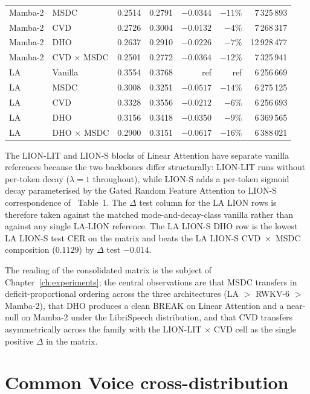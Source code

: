 {\begin{longtable}{@{}p{2.6cm} p{2.4cm} r r r r r@{}}
Mamba-2  & MSDC              & 0.2514 & 0.2791 & $-0.0344$ & $-11\%$ & 7\,325\,893 \\
Mamba-2  & CVD               & 0.2726 & 0.3004 & $-0.0132$ & $-4\%$  & 7\,268\,317 \\
Mamba-2  & DHO               & 0.2637 & 0.2910 & $-0.0226$ & $-7\%$  & 12\,928\,477 \\
Mamba-2  & CVD $\times$ MSDC & 0.2501 & 0.2772 & $-0.0364$ & $-12\%$ & 7\,325\,941 \\
\addlinespace
LA       & Vanilla           & 0.3554 & 0.3768 & ref       & ref     & 6\,256\,669 \\
LA       & MSDC              & 0.3008 & 0.3251 & $-0.0517$ & $-14\%$ & 6\,275\,125 \\
LA       & CVD               & 0.3328 & 0.3556 & $-0.0212$ & $-6\%$  & 6\,256\,693 \\
LA       & DHO               & 0.3156 & 0.3418 & $-0.0350$ & $-9\%$  & 6\,369\,565 \\
LA       & DHO $\times$ MSDC & 0.2900 & 0.3151 & $-0.0617$ & $-16\%$ & 6\,388\,021 \\
\bottomrule
\end{longtable}
}

The LION-LIT and LION-S blocks of Linear Attention have separate
vanilla references because the two backbones differ structurally:
LION-LIT runs without per-token decay ($\lambda = 1$ throughout),
while LION-S adds a per-token sigmoid decay parameterised by the
Gated Random Feature Attention to LION-S correspondence
of~\citet{afzal2025linear} Table~1. The $\Delta$ test column for
the LA LION rows is therefore taken against the matched
mode-and-decay-class vanilla rather than against any single
LA-LION reference. The LA LION-S DHO row is the lowest LA LION-S
test CER on the matrix and beats the LA LION-S CVD~$\times$~MSDC
composition ($0.1129$) by $\Delta$ test $-0.014$.

The reading of the consolidated matrix is the subject of
Chapter~\ref{ch:experiments}; the central observations are that
MSDC transfers in deficit-proportional ordering across the three
architectures (LA $>$ RWKV-6 $>$ Mamba-2), that DHO produces a
clean BREAK on Linear Attention and a near-null on Mamba-2 under
the LibriSpeech distribution, and that CVD transfers
asymmetrically across the family with the LION-LIT $\times$ CVD
cell as the single positive $\Delta$ in the matrix.

\section{Common Voice cross-distribution}\label{app:results:cv}

